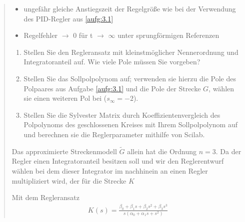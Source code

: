\begin{quote}
\begin{itemize}
            \item ungefähr gleiche Anstiegszeit der Regelgröße wie bei der Verwendung des PID-Regler aus \ref{aufg:3.1}
            
            \item Regelfehler $\to$ 0 für t $\to$ $\infty$ unter sprungförmigen Referenzen
        
        \end{itemize}
        \vspace{1em}
        
        \begin{enumerate}
            
            \item Stellen Sie den Regleransatz mit kleinstmöglicher Nennerordnung und Integratoranteil auf. Wie viele Pole
            müssen Sie vorgeben?
            
            \item Stellen Sie das Sollpolpolynom auf; verwenden sie hierzu die Pole des Polpaares aus Aufgabe \ref{aufg:3.1}
            und die Pole der Strecke $G$, wählen sie einen weiteren Pol bei ($s_\infty = -2$).
            
            \item Stellen Sie die Sylvester Matrix durch Koeffizientenvergleich des Polpolynoms des geschlossenen Kreises
            mit Ihrem Sollpolpolynom auf und berechnen sie die Reglerparameter mithilfe von Scilab.
        
        \end{enumerate}\vspace{1em}
        
        Das approximierte Streckenmodell $\tilde{G}$ allein hat die Ordnung $n = 3$. Da der Regler einen
        Integratoranteil besitzen soll und wir den Reglerentwurf wählen bei dem dieser Integrator im nachhinein
        an einen Regler multipliziert wird, der für die Strecke $K $ 
        
        
        
        Mit dem Regleransatz\\
        
        \begin{equation*}
            \begin{split}
                K(s) = \frac{\beta_0 + \beta_1 s + \beta_2 s^2 + \beta_3 s^3}{s(\alpha_0 + \alpha_1 s + s^2)}
            \end{split}
        \end{equation*}\vspace{1em}
        

\end{quote}
